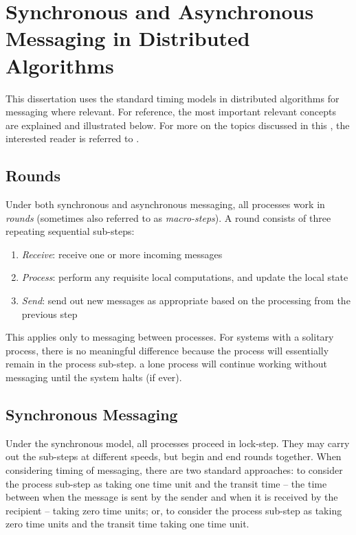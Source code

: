 \section{\label{sec:back:syncasync}Synchronous and Asynchronous Messaging in Distributed Algorithms}

This dissertation uses the standard timing models in distributed algorithms \cite{Lynch1996} for messaging where relevant.  For reference, the most important relevant concepts are explained and illustrated below.  For more on the topics discussed in this , the interested reader is referred to \cite{Fokkink2013,Lynch1996,Tel2000}.

\subsection{Rounds}
Under both synchronous and asynchronous messaging, all processes work in \emph{rounds} (sometimes also referred to as \emph{macro-steps}).  A round consists of three repeating sequential sub-steps:
\begin{enumerate}
    \item \emph{\textsf{Receive}}:  receive one or more incoming messages
    \item \emph{\textsf{Process}}:  perform any requisite local computations, and update the local state
    \item \emph{\textsf{Send}}:  send out new messages as appropriate based on the processing from the previous step
\end{enumerate}
This applies only to messaging between processes.  For systems with a solitary process, there is no meaningful difference because the process will essentially remain in the \textsf{process} sub-step.  \Ie{} a lone process will continue working without messaging until the system halts (if ever).

\subsection{Synchronous Messaging}
Under the synchronous model, all processes proceed in lock-step.  They may carry out the sub-steps at different speeds, but begin and end rounds together.  When considering timing of messaging, there are two standard approaches:  to consider the \textsf{process} sub-step as taking one time unit and the transit time -- the time between when the message is sent by the sender and when it is received by the recipient -- taking zero time units; or, to consider the \textsf{process} sub-step as taking zero time units and the transit time taking one time unit.

